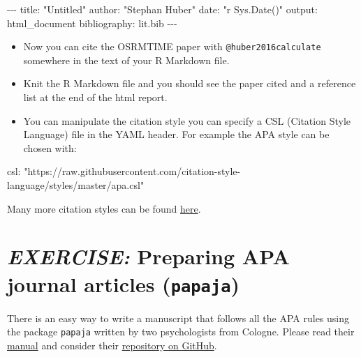 \documentclass[
  12pt,
  oneside]{book}
\newenvironment{Shaded}{\begin{snugshade}}{\end{snugshade}}
\newcommand{\NormalTok}[1]{#1}
\providecommand{\tightlist}{%
  \setlength{\itemsep}{0pt}\setlength{\parskip}{0pt}}
\begin{document}
\begin{Shaded}
\begin{Highlighting}[]
\NormalTok{{-}{-}{-}}
\NormalTok{title: "Untitled"}
\NormalTok{author: "Stephan Huber"}
\NormalTok{date: "\textasciigrave{}r Sys.Date()\textasciigrave{}"}
\NormalTok{output: html\_document}
\NormalTok{bibliography: lit.bib}
\NormalTok{{-}{-}{-}}
\end{Highlighting}
\end{Shaded}

\begin{itemize}
\tightlist
\item
  Now you can cite the OSRMTIME paper with \texttt{@huber2016calculate} somewhere in the text of your R Markdown file.
\item
  Knit the R Markdown file and you should see the paper cited and a reference list at the end of the html report.
\item
  You can manipulate the citation style you can specify a CSL (Citation Style Language) file in the YAML header. For example the APA style can be chosen with:
\end{itemize}

\begin{Shaded}
\begin{Highlighting}[]
\NormalTok{csl: "https://raw.githubusercontent.com/citation{-}style{-}language/styles/master/apa.csl"}
\end{Highlighting}
\end{Shaded}

Many more citation styles can be found \href{https://github.com/citation-style-language/styles}{here}.

\hypertarget{exercise-preparing-apa-journal-articles-papaja}{%
\section*{\texorpdfstring{\emph{EXERCISE:} Preparing APA journal articles (\texttt{papaja})}{EXERCISE: Preparing APA journal articles (papaja)}}\label{exercise-preparing-apa-journal-articles-papaja}}

There is an easy way to write a manuscript that follows all the APA rules using the package \texttt{papaja} written by two psychologists from Cologne. Please read their \href{https://frederikaust.com/papaja_man/introduction.html}{manual} and consider their \href{https://github.com/crsh/papaja}{repository on GitHub}.
\end{document}
